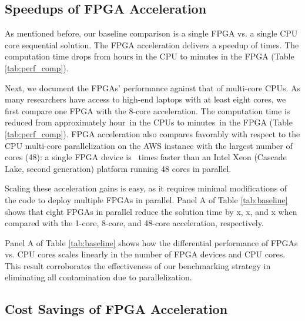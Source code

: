 \documentclass[12pt,american]{article}
\makeatletter
\newcommand{\resultsfolder}{./results}
\newcommand{\baselinespeedupFPGAICPUI}{\@\xspace}
\newcommand{\cpuItimehoursminutes}{ hours\@\xspace}
\newcommand{\fpgaItimehoursminutes}{ minutes\@\xspace}
\newcommand{\baselinespeedupFPGAICPUIII}{}
\newcommand{\baselinespeedupFPGAIIICPUI}{}
\newcommand{\baselinespeedupFPGAIIICPUII}{}
\newcommand{\baselinespeedupFPGAIIICPUIII}{}
\newcommand{\cpuIItimehoursminutes}{approximately  hour\@\xspace}
\makeatother
\begin{document}
\subsection{Speedups of FPGA Acceleration}\label{sec:res}
 
As mentioned before, our baseline comparison is a single FPGA vs. a single CPU core sequential solution. The FPGA acceleration delivers a speedup of \baselinespeedupFPGAICPUI times. The computation time drops from \cpuItimehoursminutes in the CPU to \fpgaItimehoursminutes in the FPGA (Table \ref{tab:perf_comp}). 

Next, we document the FPGAs' performance against that of multi-core CPUs. As many researchers have access to high-end laptops with at least eight cores, we first compare one FPGA with the 8-core acceleration. The computation time is reduced from \cpuIItimehoursminutes\ in the CPUs to \fpgaItimehoursminutes\ in the FPGA (Table \ref{tab:perf_comp}). FPGA acceleration also compares favorably with respect to the CPU multi-core parallelization on the AWS instance with the largest number of cores (48): a single FPGA device is \baselinespeedupFPGAICPUIII\, times faster than an Intel Xeon (Cascade Lake, second generation) platform running 48 cores in parallel.

Scaling these acceleration gains is easy, as it requires minimal modifications of the code to deploy multiple FPGAs in parallel. Panel A of Table \ref{tab:baseline} shows that eight FPGAs in parallel reduce the solution time by \baselinespeedupFPGAIIICPUI\hspace{-0.12cm}x, \baselinespeedupFPGAIIICPUII\hspace{-0.12cm}x, and \baselinespeedupFPGAIIICPUIII\hspace{-0.12cm}x when compared with the 1-core, 8-core, and 48-core acceleration, respectively. 

Panel A of Table \ref{tab:baseline} shows how the differential performance of FPGAs vs. CPU cores scales linearly in the number of FPGA devices and CPU cores. This result corroborates the effectiveness of our benchmarking strategy in eliminating all contamination due to parallelization. 

\subsection{Cost Savings of FPGA Acceleration}\label{subsec:cost}
\end{document}
